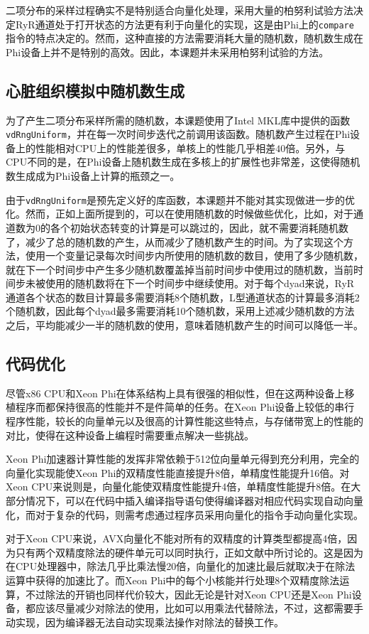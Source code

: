 二项分布的采样过程确实不是特别适合向量化处理，采用大量的柏努利试验方法决定RyR通道处于打开状态的方法更有利于向量化的实现，这是由Phi上的\texttt{compare}指令的特点决定的。然而，这种直接的方法需要消耗大量的随机数，随机数生成在Phi设备上并不是特别的高效。因此，本课题并未采用柏努利试验的方法。

\subsection{心脏组织模拟中随机数生成}
为了产生二项分布采样所需的随机数，本课题使用了Intel MKL库中提供的函数\texttt{vdRngUniform}，并在每一次时间步迭代之前调用该函数。随机数产生过程在Phi设备上的性能相对CPU上的性能差很多，单核上的性能几乎相差$40$倍。另外，与CPU不同的是，在Phi设备上随机数生成在多核上的扩展性也非常差，这使得随机数生成成为Phi设备上计算的瓶颈之一。

由于\texttt{vdRngUniform}是预先定义好的库函数，本课题并不能对其实现做进一步的优化。然而，正如上面所提到的，可以在使用随机数的时候做些优化，比如，对于通道数为0的各个初始状态转变的计算是可以跳过的，因此，就不需要消耗随机数了，减少了总的随机数的产生，从而减少了随机数产生的时间。为了实现这个方法，使用一个变量记录每次时间步内所使用的随机数的数目，使用了多少随机数，就在下一个时间步中产生多少随机数覆盖掉当前时间步中使用过的随机数，当前时间步未被使用的随机数将在下一个时间步中继续使用。对于每个dyad来说，RyR通道各个状态的数目计算最多需要消耗8个随机数，L型通道状态的计算最多消耗2个随机数，因此每个dyad最多需要消耗10个随机数，采用上述减少随机数的方法之后，平均能减少一半的随机数的使用，意味着随机数产生的时间可以降低一半。

\subsection{代码优化}
尽管x86 CPU和Xeon Phi在体系结构上具有很强的相似性，但在这两种设备上移植程序而都保持很高的性能并不是件简单的任务。在Xeon Phi设备上较低的串行程序性能，较长的向量单元以及很高的计算性能这些特点，与存储带宽上的性能的对比，使得在这种设备上编程时需要重点解决一些挑战。

Xeon Phi加速器计算性能的发挥非常依赖于512位向量单元得到充分利用，完全的向量化实现能使Xeon Phi的双精度性能直接提升8倍，单精度性能提升16倍。对Xeon CPU来说则是，向量化能使双精度性能提升4倍，单精度性能提升8倍。在大部分情况下，可以在代码中插入编译指导语句使得编译器对相应代码实现自动向量化，而对于复杂的代码，则需考虑通过程序员采用向量化的指令手动向量化实现。

对于Xeon CPU来说，AVX向量化不能对所有的双精度的计算类型都提高4倍，因为只有两个双精度除法的硬件单元可以同时执行，正如文献中所讨论的。这是因为在CPU处理器中，除法几乎比乘法慢20倍，向量化的加速比最后就取决于在除法运算中获得的加速比了。而Xeon Phi中的每个小核能并行处理8个双精度除法运算，不过除法的开销也同样代价较大，因此无论是针对Xeon CPU还是Xeon Phi设备，都应该尽量减少对除法的使用，比如可以用乘法代替除法，不过，这都需要手动实现，因为编译器无法自动实现乘法操作对除法的替换工作。

